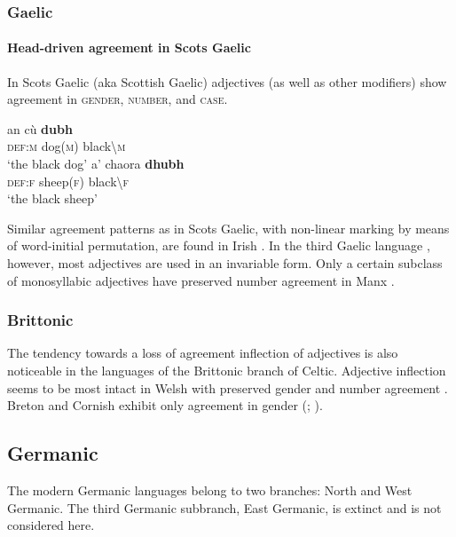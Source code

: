 \subsubsection{Gaelic}
\paragraph*{Head\hyp{}driven agreement in Scots Gaelic} 
In Scots Gaelic (aka Scottish Gaelic) adjectives (as well as other modifiers) show agreement in \textsc{gender, number}, and \textsc{case}.
\begin{exe}
\begin{xlist}
\ex
\gll	an cù \textbf{dubh}\\
	\textsc{def:m} dog(\textsc{m}) black\textbackslash\textsc{m}\\
\glt	‘the black dog’
\ex
\gll	a' chaora \textbf{dhubh}\\
	\textsc{def:f} sheep(\textsc{f}) black\textbackslash\textsc{f}\\
\glt	‘the black sheep’
\end{xlist}
\end{exe}
Similar agreement patterns as in Scots Gaelic, with non-linear marking by means of word-initial permutation, are found in Irish \citep[73, 97]{odochartaigh1992}. In the third Gaelic language , however, most adjectives are used in an invariable form. Only a certain subclass of monosyllabic adjectives have preserved number agreement in Manx \citep[127]{thomsen1992}.

\subsubsection{Brittonic}
The tendency towards a loss of agreement inflection of adjectives is also noticeable in the languages of the Brittonic branch of Celtic. Adjective inflection seems to be most intact in Welsh with preserved gender and number agreement \citep[298–299]{thomas1992a}. Breton and Cornish exhibit only agreement in gender (\citealt[405]{ternes1992}; \citealt[355]{thomas1992b}).

\subsection{Germanic}
The modern Germanic languages belong to two branches: North and West Germanic. The third Germanic subbranch, East Germanic, is extinct and is not considered here.

